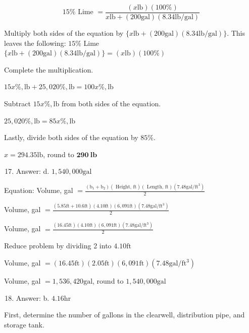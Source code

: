 \documentclass[10pt]{article}
\begin{document}
$$
15 \% \text { Lime }=\frac{(x \mathrm{lb})(100 \%)}{x \mathrm{lb}+(200 \mathrm{gal})(8.34 \mathrm{lb} / \mathrm{gal})}
$$

Multiply both sides of the equation by $\{x \mathrm{lb}+(200 \mathrm{gal})(8.34 \mathrm{lb} / \mathrm{gal})\}$. This leaves the following: $15 \%$ Lime $\{x \mathrm{lb}+(200 \mathrm{gal})(8.34 \mathrm{lb} / \mathrm{gal})\}=(x \mathrm{lb})(100 \%)$

Complete the multiplication.

$15 x \%, \mathrm{lb}+25,020 \%, \mathrm{lb}=100 x \%, \mathrm{lb}$

Subtract $15 x \%, \mathrm{lb}$ from both sides of the equation.

$25,020 \%, \mathrm{lb}=85 x \%, \mathrm{lb}$

Lastly, divide both sides of the equation by $85 \%$.

$x=294.35 \mathrm{lb}$, round to $\mathbf{2 9 0} \mathbf{~ l b}$

\begin{enumerate}
  \setcounter{enumi}{16}
  \item Answer: d. $1,540,000 \mathrm{gal}$
\end{enumerate}

Equation: Volume, gal $=\frac{\left(\mathrm{b}_{1}+\mathrm{b}_{2}\right)(\text { Height, } \mathrm{ft})(\text { Length, } \mathrm{ft})\left(7.48 \mathrm{gal} / \mathrm{ft}^{3}\right)}{2}$

Volume, gal $=\frac{(5.85 \mathrm{ft}+10.6 \mathrm{ft})(4.10 \mathrm{ft})(6,091 \mathrm{ft})\left(7.48 \mathrm{gal} / \mathrm{ft}^{3}\right)}{2}$

Volume, gal $=\frac{(16.45 \mathrm{ft})(4.10 \mathrm{ft})(6,091 \mathrm{ft})\left(7.48 \mathrm{gal} / \mathrm{ft}^{3}\right)}{2}$

Reduce problem by dividing 2 into $4.10 \mathrm{ft}$

Volume, gal $=(16.45 \mathrm{ft})(2.05 \mathrm{ft})(6,091 \mathrm{ft})\left(7.48 \mathrm{gal} / \mathrm{ft}^{3}\right)$

Volume, gal $=1,536,420 \mathrm{gal}$, round to $1,540,000 \mathrm{gal}$

\begin{enumerate}
  \setcounter{enumi}{17}
  \item Answer: b. $4.16 \mathrm{hr}$
\end{enumerate}

First, determine the number of gallons in the clearwell, distribution pipe, and storage tank.
\end{document}
